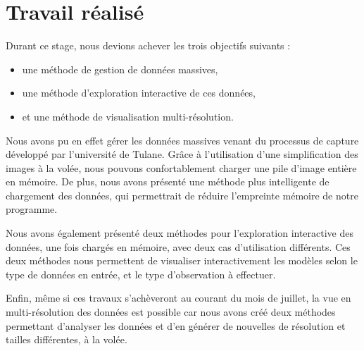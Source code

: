 {	\section{Travail réalisé}
	{
		Durant ce stage, nous devions achever les trois objectifs suivants :~\begin{itemize}
			\item une méthode de gestion de données massives,
			\item une méthode d'exploration interactive de ces données,
			\item et une méthode de visualisation multi-résolution.
		\end{itemize}\par
		Nous avons pu en effet gérer les données massives venant du processus de capture développé par l'université de Tulane. Grâce à l'utilisation d'une simplification des images à la volée, nous pouvons confortablement charger une pile d'image entière en mémoire. De plus, nous avons présenté une méthode plus intelligente de chargement des données, qui permettrait de réduire l'empreinte mémoire de notre programme.\par
		Nous avons également présenté deux méthodes pour l'exploration interactive des données, une fois chargés en mémoire, avec deux cas d'utilisation différents. Ces deux méthodes nous permettent de visualiser interactivement les modèles selon le type de données en entrée, et le type d'observation à effectuer.\par
		Enfin, même si ces travaux s'achèveront au courant du mois de juillet, la vue en multi-résolution des données est possible car nous avons créé deux méthodes permettant d'analyser les données et d'en générer de nouvelles de résolution et tailles différentes, à la volée.\par
	}

}
